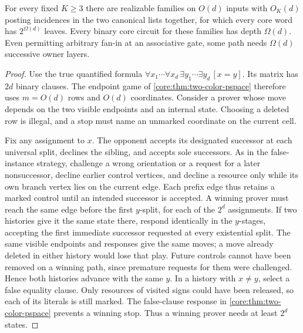 \begin{corollary}
\label{core:cor:compact-guards-large-trees}
For every fixed $K\ge3$ there are realizable families on $O(d)$
inputs with $O_K(d)$ posting incidences in the two canonical lists
together, for
which every core word has $2^{\Omega(d)}$ leaves. Every binary core
circuit for these families has depth $\Omega(d)$. Even permitting
arbitrary fan-in at an associative gate, some path needs
$\Omega(d)$ successive owner layers.
\end{corollary}
\begin{proof}
Use the true quantified formula
$\forall x_1\cdots\forall x_d\,\exists y_1\cdots\exists y_d
\,[x=y]$. Its matrix has $2d$ binary clauses. The endpoint game
of \cref{core:thm:two-color-pspace} therefore uses $m=O(d)$ rows
and $O(d)$ coordinates. Consider a prover whose move depends on
the two visible endpoints and an internal state. Choosing a deleted
row is illegal, and a stop must name an unmarked coordinate on
the current cell.

Fix any assignment to $x$. The opponent accepts its designated
successor at each universal split, declines the sibling, and accepts
sole successors. As in the false-instance strategy, challenge a
wrong orientation or a request for a later nonsuccessor, decline
earlier control vertices, and decline a resource only while its
own branch vertex lies on the current edge. Each prefix edge thus
retains a marked control until an intended successor is accepted.
A winning prover must reach the same edge before the first $y$-split,
for each of the $2^d$ assignments. If two histories give it the
same state there, respond identically in the $y$-stages, accepting
the first immediate successor requested at every existential split.
The same visible endpoints and responses give the same moves; a
move already deleted in either history would lose that play.
Future controls cannot have been removed on a winning path, since
premature requests for them were challenged. Hence both histories
advance with the same $y$. In a history with $x\ne y$, select a
false equality clause. Only resources of visited signs could have
been released, so each of its literals is still marked. The
false-clause response in \cref{core:thm:two-color-pspace} prevents
a winning stop. Thus a winning prover needs at least $2^d$ states.


\end{proof}
